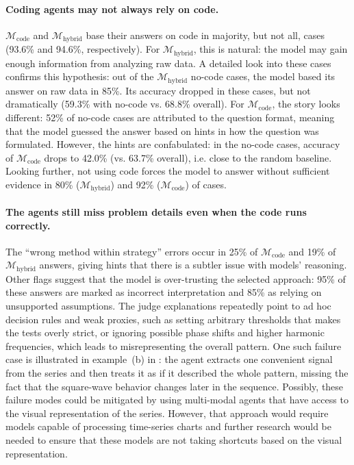 \documentclass[11pt]{article}
\newcommand{\mcode}{$\mathcal{M}_{\text{code}}$}
\newcommand{\mhybrid}{$\mathcal{M}_{\text{hybrid}}$}
\begin{document}
\paragraph{Coding agents may not always rely on code.}
\mcode{} and \mhybrid{} base their answers on code in majority, but not all, cases (93.6\% and 94.6\%, respectively). For \mhybrid{}, this is natural: the model may gain enough information from analyzing raw data. A detailed look into these cases confirms this hypothesis: out of the \mhybrid{} no-code cases, the model based its answer on raw data in 85\%. Its accuracy dropped in these cases, but not dramatically (59.3\% with no-code vs. 68.8\% overall). For \mcode{}, the story looks different: 52\% of no-code cases are attributed to the question format, meaning that the model guessed the answer based on hints in how the question was formulated. However, the hints are confabulated: in the no-code cases, accuracy of \mcode{} drops to 42.0\% (vs. 63.7\% overall), i.e. close to the random baseline. Looking further, not using code forces the model to answer without sufficient evidence in 80\% (\mhybrid{}) and 92\% (\mcode{}) of cases. 



\paragraph{The agents still miss problem details even when the code runs correctly.} The ``wrong method within strategy'' errors occur in 25\% of \mcode{} and 19\% of \mhybrid{} answers, giving hints that there is a subtler issue with models' reasoning. Other flags suggest that the model is over-trusting the selected approach: 95\% of these answers are marked as incorrect interpretation and 85\% as relying on unsupported assumptions. The judge explanations repeatedly point to ad hoc decision rules and weak proxies, such as setting arbitrary thresholds that makes the tests overly strict, or ignoring possible phase shifts and higher harmonic frequencies, which leads to misrepresenting the overall pattern. One such failure case is illustrated in example~(b) in : the agent extracts one convenient signal from the series and then treats it as if it described the whole pattern, missing the fact that the square-wave behavior changes later in the sequence. Possibly, these failure modes could be mitigated by using multi-modal agents that have access to the visual representation of the series. However, that approach would require models capable of processing time-series charts and further research would be needed to ensure that these models are not taking shortcuts based on the visual representation.
\end{document}
